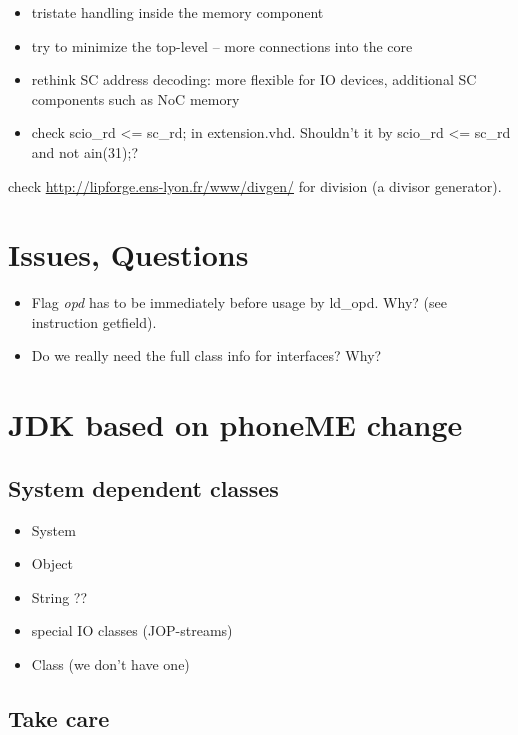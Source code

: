 \documentclass[a4paper,12pt]{scrartcl}
\newcommand{\code}[1]{{\textsf{#1}}}
\begin{document}
\begin{itemize}
    \item tristate handling inside the memory component
    \item try to minimize the top-level -- more connections into the
    core
    \item rethink SC address decoding: more flexible for IO devices,
    additional SC components such as NoC memory
    \item check \code{scio\_rd <= sc\_rd;} in \code{extension.vhd}.
    Shouldn't it by \code{scio\_rd <= sc\_rd and not ain(31);}?
\end{itemize}

check \url{http://lipforge.ens-lyon.fr/www/divgen/} for division (a
divisor generator).

\section{Issues, Questions}

\begin{itemize}
    \item Flag \emph{opd} has to be immediately before usage by ld\_opd.
    Why? (see instruction getfield).
    \item Do we really need the full class info for interfaces? Why?
\end{itemize}

\section{JDK based on phoneME change}

\subsection{System dependent classes}

\begin{itemize}
  \item System
  \item Object
  \item String ??
  \item special IO classes (JOP-streams)
  \item Class (we don't have one)
\end{itemize}

\subsection{Take care}
\end{document}
